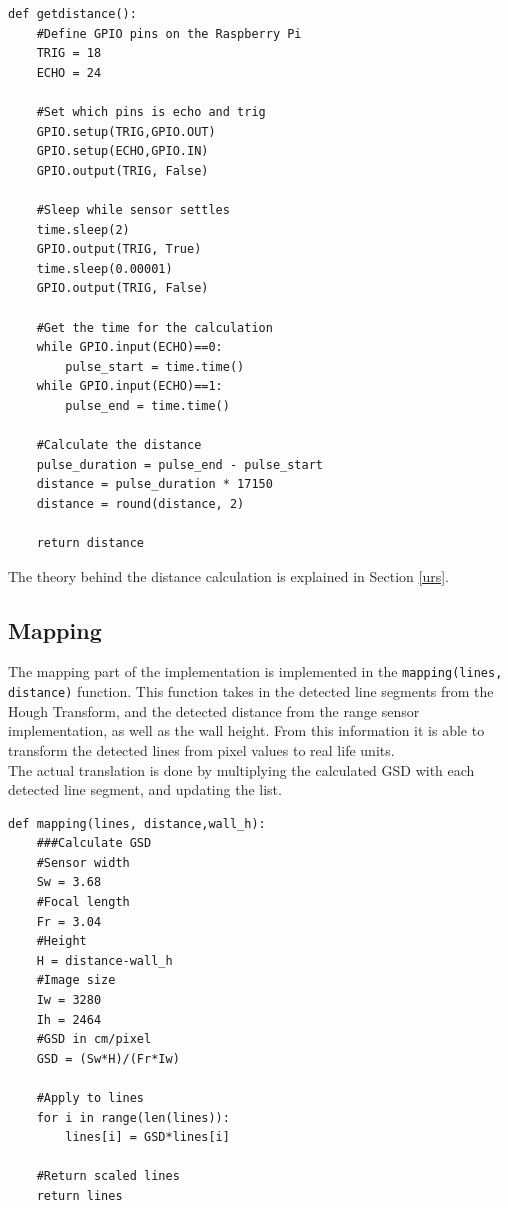 \begin{verbatim}
def getdistance():
    #Define GPIO pins on the Raspberry Pi
    TRIG = 18 
    ECHO = 24
    
    #Set which pins is echo and trig
    GPIO.setup(TRIG,GPIO.OUT)
    GPIO.setup(ECHO,GPIO.IN)
    GPIO.output(TRIG, False)
    
    #Sleep while sensor settles
    time.sleep(2)
    GPIO.output(TRIG, True)
    time.sleep(0.00001)
    GPIO.output(TRIG, False)

    #Get the time for the calculation
    while GPIO.input(ECHO)==0:
        pulse_start = time.time()
    while GPIO.input(ECHO)==1:
        pulse_end = time.time()

    #Calculate the distance
    pulse_duration = pulse_end - pulse_start
    distance = pulse_duration * 17150
    distance = round(distance, 2)
    
    return distance
\end{verbatim}
The theory behind the distance calculation is explained in Section \ref{urs}. 


\subsection{Mapping}
The mapping part of the implementation is implemented in the \texttt{mapping(lines, distance)} function. This function takes in the detected line segments from the Hough Transform, and the detected distance from the range sensor implementation, as well as the wall height. From this information it is able to transform the detected lines from pixel values to real life units.\\

The actual translation is done by multiplying the calculated GSD with each detected line segment, and updating the list. 

\begin{verbatim}
def mapping(lines, distance,wall_h):
    ###Calculate GSD
    #Sensor width
    Sw = 3.68
    #Focal length
    Fr = 3.04
    #Height
    H = distance-wall_h
    #Image size
    Iw = 3280
    Ih = 2464
    #GSD in cm/pixel
    GSD = (Sw*H)/(Fr*Iw)
	
    #Apply to lines
    for i in range(len(lines)):
        lines[i] = GSD*lines[i]
        
    #Return scaled lines
    return lines
\end{verbatim}

